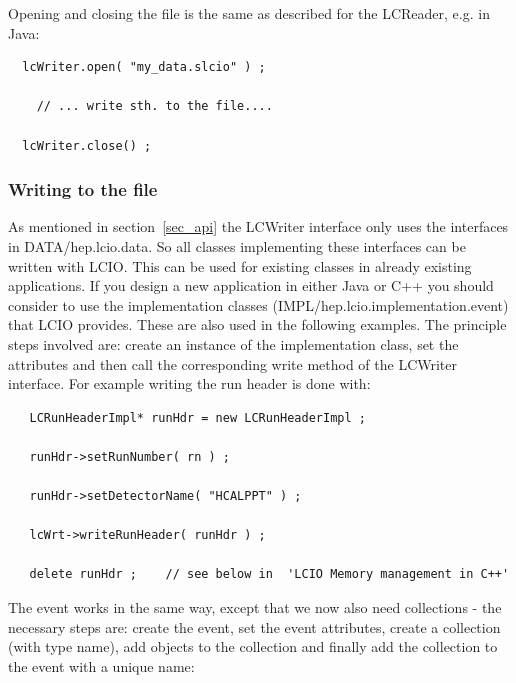 \documentclass[twoside]{article}
\begin{document}
Opening and closing the file is the same as described for the LCReader, e.g. in Java:
\begin{verbatim}
  lcWriter.open( "my_data.slcio" ) ;

    // ... write sth. to the file....

  lcWriter.close() ;
\end{verbatim}

\subsubsection{Writing to the file}
As mentioned in section~\ref{sec_api} the LCWriter interface only uses the interfaces 
in DATA/hep.lcio.data. So all classes implementing these interfaces can be written with LCIO.
This can be used for existing classes in already existing applications. 
If  you design a new application in either Java or C++ you should consider to use the implementation
classes (IMPL/hep.lcio.implementation.event) that LCIO provides.
These are also used in the following examples. The principle steps involved are: 
create an instance of the implementation class, set the attributes and then call the corresponding
write method of the LCWriter interface.
For example writing the run header is done with:

\begin{verbatim}
   LCRunHeaderImpl* runHdr = new LCRunHeaderImpl ; 

   runHdr->setRunNumber( rn ) ;
   
   runHdr->setDetectorName( "HCALPPT" ) ;
   
   lcWrt->writeRunHeader( runHdr ) ;

   delete runHdr ;    // see below in  'LCIO Memory management in C++'
\end{verbatim}

The event works in the same way, except that we now also need collections - the necessary steps are:
create the event, set the event attributes, create a collection (with type name), add objects to the 
collection and finally add the collection to the event with a unique name:
\end{document}
